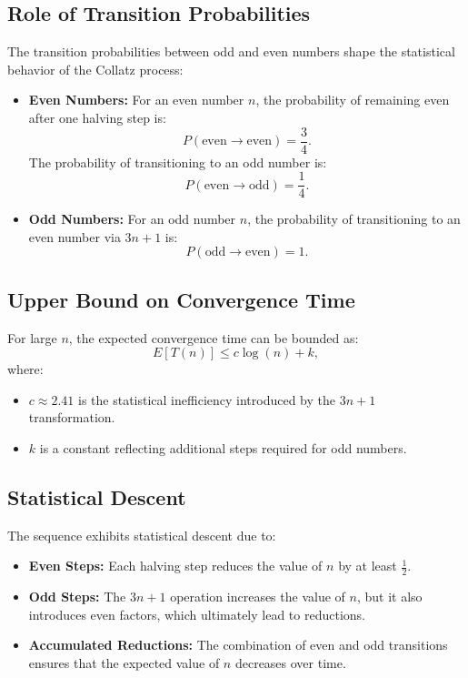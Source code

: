 \subsection{Role of Transition Probabilities}
The transition probabilities between odd and even numbers shape the statistical behavior of the Collatz process:
\begin{itemize}
    \item \textbf{Even Numbers:} For an even number \( n \), the probability of remaining even after one halving step is:
    \[
    P(\text{even} \to \text{even}) = \frac{3}{4}.
    \]
    The probability of transitioning to an odd number is:
    \[
    P(\text{even} \to \text{odd}) = \frac{1}{4}.
    \]

    \item \textbf{Odd Numbers:} For an odd number \( n \), the probability of transitioning to an even number via \( 3n + 1 \) is:
    \[
    P(\text{odd} \to \text{even}) = 1.
    \]
\end{itemize}

\subsection{Upper Bound on Convergence Time}
For large \( n \), the expected convergence time can be bounded as:
\[
E[T(n)] \leq c \log(n) + k,
\]
where:
\begin{itemize}
    \item \( c \approx 2.41 \) is the statistical inefficiency introduced by the \( 3n+1 \) transformation.
    \item \( k \) is a constant reflecting additional steps required for odd numbers.
\end{itemize}

\subsection{Statistical Descent}
The sequence exhibits statistical descent due to:
\begin{itemize}
    \item \textbf{Even Steps:} Each halving step reduces the value of \( n \) by at least \( \frac{1}{2} \).
    \item \textbf{Odd Steps:} The \( 3n + 1 \) operation increases the value of \( n \), but it also introduces even factors, which ultimately lead to reductions.
    \item \textbf{Accumulated Reductions:} The combination of even and odd transitions ensures that the expected value of \( n \) decreases over time.
\end{itemize}


